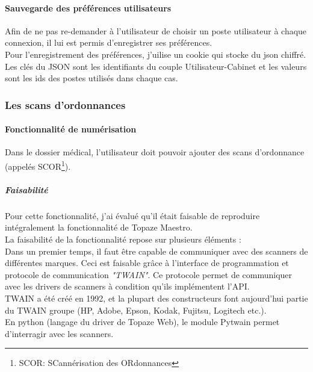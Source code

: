 \paragraph*{Sauvegarde des préférences utilisateurs\\}
Afin de ne pas re-demander à l'utilisateur de choisir un poste utilisateur à chaque connexion, il lui est permis d'enregistrer ses préférences.\\
Pour l'enregistrement des préférences, j'uilise un cookie qui stocke du json chiffré. Les clés du JSON sont les identifiants du couple Utilisateur-Cabinet et les valeurs sont les ids des postes utilisés dans chaque cas.






\subsubsection{Les scans d'ordonnances}
\paragraph*{Fonctionnalité de numérisation\\}
Dans le dossier médical, l'utilisateur doit pouvoir ajouter des scans d'ordonnance (appelés SCOR\footnote{SCOR: SCannérisation des ORdonnances}).

\subparagraph*{Faisabilité}
Pour cette fonctionnalité, j'ai évalué qu'il était faisable de reproduire intégralement la fonctionnalité de Topaze Maestro.\\

La faisabilité de la fonctionnalité repose sur plusieurs éléments :\\
Dans un premier temps, il faut être capable de communiquer avec des scanners de différentes marques. Ceci est faisable grâce à l'interface de programmation et protocole de communication \textit{"TWAIN"}. Ce protocole permet de communiquer avec les drivers de  scanners à condition qu'ils implémentent l'API.\\
TWAIN a été créé en 1992, et la plupart des constructeurs font aujourd'hui partie du TWAIN groupe (HP, Adobe, Epson, Kodak, Fujitsu, Logitech etc.).\\
En python (langage du driver de Topaze Web), le module Pytwain permet d'interragir avec les scanners.\\

